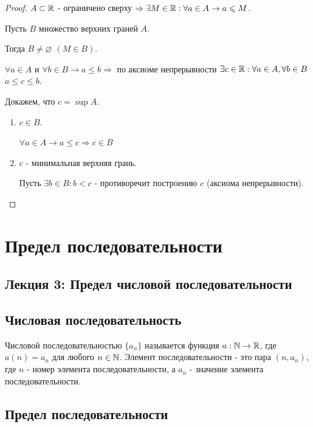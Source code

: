 	\begin{proof}
		$A \subset \mathbb R$ - ограничено сверху $\Rightarrow \exists M \in \mathbb R : \forall a \in A \rightarrow a \leqslant M$.
		
		Пусть $B$ множество верхних граней $A$.
		
		Тогда $B \neq \varnothing$ $(M \in B)$.
		
		$\forall a \in A$ и $\forall b \in B \rightarrow a \leqslant b \Rightarrow$ по аксиоме непрерывности $\exists c \in \mathbb R : \forall a \in A, \forall b \in B$ $a \leqslant c \leqslant b$.
		
		Докажем, что $c = \sup{A}$.
		\begin{enumerate}
			\item $c \in B$.
			
			$\forall a \in A \rightarrow a \leqslant c \Rightarrow c \in B$
			
			\item $c$ - минимальная верхняя грань.
			
			Пусть $\exists b \in B : b < c$ - противоречит построению $c$ (аксиома непрерывности).
		\end{enumerate}
	\end{proof}
	
	\newpage
	
	\chapter{Предел последовательности}
	
	\section*{Лекция 3: Предел числовой последовательности}
	
	\section{Числовая последовательность}
	
	\begin{definition}
		Числовой последовательностью $\{a_n\}$ называется функция $a : \mathbb N \rightarrow \mathbb R$, где $a(n) = a_n$ для любого $n \in \mathbb N$. Элемент
		последовательности - это пара $(n, a_n)$, где $n$ - номер элемента
		последовательности, а $a_n$ - значение элемента последовательности.
	\end{definition}
	
	\section{Предел последовательности}
	
